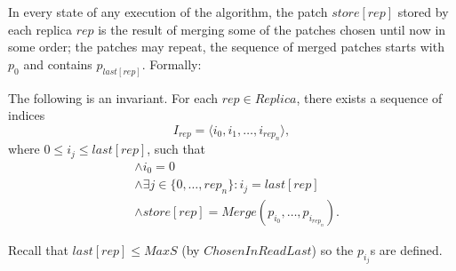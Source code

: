 \documentclass[12pt,a4paper,en]{pracamgr}
\begin{document}
In every state of any execution of the algorithm, the patch $store[rep]$ stored by each replica $rep$ is the result of merging some of the patches chosen until now in some order; the patches may repeat, the sequence of merged patches starts with $p_0$ and contains $p_{last[rep]}$. Formally:
\begin{lemma}\label{rep-merged-seq}
    The following is an invariant. For each $rep \in Replica$, there exists a sequence of indices
    $$ I_{rep} = \langle i_0, i_1, \dots, i_{rep_n}\rangle , $$
    where $0 \le i_j \le last[rep]$, such that
    \begin{align*}
        & \land i_0 = 0\\
        & \land \exists j \in \{0, \dots, rep_n\}: i_j = last[rep]\\
        & \land store[rep] = Merge(p_{i_0}, \dots, p_{i_{rep_n}}).
    \end{align*}
\end{lemma}

Recall that $last[rep] \le MaxS$ (by $ChosenInReadLast$) so the $p_{i_j}$s are defined.
\end{document}
